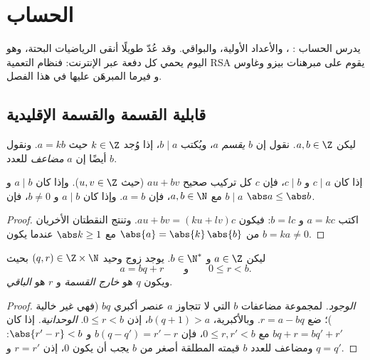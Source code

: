 \chapter{الحساب}\label{ch:g12:arith}

يدرس الحساب : ، والأعداد الأولية، والبواقي.
وقد عُدّ طويلًا أنقى الرياضيات البحتة، وهو اليوم يحمي كل دفعة
عبر الإنترنت: فنظام التعمية RSA يقوم على مبرهنات بيزو وغاوس و
فيرما المبرهَن عليها في هذا الفصل.

\section{قابلية القسمة والقسمة الإقليدية}

\begin{definition}\label{def:g12:arith:divides}
ليكن $a, b \in \Z$. نقول إن $b$ \emph{يقسم} $a$، ويُكتب
$b \mid a$، إذا وُجد $k \in \Z$ حيث $a = kb$. ونقول أيضًا إن $a$
\emph{مضاعف} للعدد $b$.
\end{definition}

\begin{proposition}\label{prop:g12:arith:divprops}
إذا كان $c \mid a$ و $c \mid b$، فإن $c$  كل تركيب صحيح
$au + bv$ (حيث $u, v \in \Z$). وإذا كان $a \mid b$ و $b \mid a$ مع
$a,b \in \N$، فإن $a = b$. وإذا كان $a \mid b$ و $b \neq 0$، فإن $\abs a \leq \abs b$.
\end{proposition}

\begin{proof}
اكتب $a = kc$ و $b = lc$: فيكون $au + bv = (ku + lv)c$. وتنتج النقطتان الأخريان
من $\abs{a} = \abs{k}\,\abs{b}$ مع $\abs k \geq 1$ عندما يكون
$b = ka \neq 0$.
\end{proof}

\begin{theorem}\label{thm:g12:arith:euclid}
ليكن $a \in \Z$ و $b \in \N^*$. يوجد زوج وحيد
$(q, r) \in \Z \times \N$ بحيث
\[
a = bq + r \qquad\text{و}\qquad 0 \leq r < b .
\]
ويكون $q$ هو \emph{خارج القسمة} و $r$ هو \emph{الباقي}.
\end{theorem}

\begin{proof}
\emph{الوجود.} لمجموعة مضاعفات $b$ التي لا تتجاوز $a$ عنصر
أكبري $bq$ (فهي غير خالية )؛ ضع $r = a - bq$.
وبالأكبرية، $b(q+1) > a$، إذن $0 \leq r < b$.
\emph{الوحدانية.} إذا كان $bq + r = bq' + r'$ مع $0 \leq r, r' < b$، فإن
$b(q - q') = r' - r$ و $\abs{r' - r} < b$: ومضاعف للعدد $b$ قيمته المطلقة
أصغر من $b$ يجب أن يكون $0$، إذن $r = r'$ و $q = q'$.
\end{proof}

